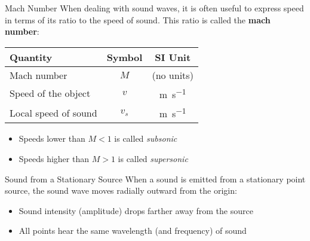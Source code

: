 \documentclass[12pt,aspectratio=169]{beamer}
\newcommand{\eq}[2]{\vspace{#1}{\Large\begin{displaymath}#2\end{displaymath}}}
\begin{document}
\begin{frame}{Mach Number}
  When dealing with sound waves, it is often useful to express speed in terms
  of its ratio to the speed of sound. This ratio is called the
  \textbf{mach number}:
  
  \eq{-.2in}{
    \boxed{M=\frac{v}{v_s}}
  }
  \begin{center}
    \begin{tabular}{l|c|c}
      \rowcolor{pink}
      \textbf{Quantity} & \textbf{Symbol} & \textbf{SI Unit} \\ \hline
      Mach number          & $M$   & (no units) \\
      Speed of the object  & $v$   & \si{\metre\per\second}\\
      Local speed of sound & $v_s$ & \si{\metre\per\second}
    \end{tabular}
  \end{center}
  \begin{itemize}
  \item Speeds lower than $M<1$ is called \emph{subsonic}
  \item Speeds higher than $M>1$ is called \emph{supersonic}
  \end{itemize}
\end{frame}



\begin{frame}{Sound from a Stationary Source}
  When a sound is emitted from a stationary point source, the sound wave moves
  radially outward from the origin:
  \begin{center}
    \begin{itemize}
    \item Sound intensity (amplitude) drops farther away from the source
    \item All points hear the same wavelength (and frequency) of sound
    \end{itemize}
  \end{center}
\end{frame}
\end{document}
